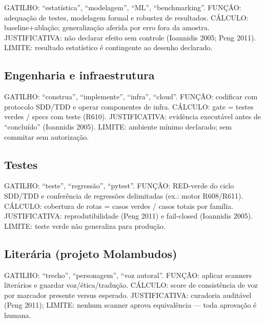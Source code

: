 \begin{descricao}
GATILHO: ``estatística'', ``modelagem'', ``ML'', ``benchmarking''.
FUNÇÃO: adequação de testes, modelagem formal e robustez de resultados.
CÁLCULO: baseline+ablação; generalização aferida por erro fora da amostra.
JUSTIFICATIVA: não declarar efeito sem controle (Ioannidis 2005; Peng 2011).
LIMITE: resultado estatístico é contingente ao desenho declarado.
\end{descricao}

\subsection{Engenharia e infraestrutura}

\begin{descricao}
GATILHO: ``construa'', ``implemente'', ``infra'', ``cloud''. FUNÇÃO:
codificar com protocolo SDD/TDD e operar componentes de infra.
CÁLCULO: gate = testes verdes / specs com teste (R610). JUSTIFICATIVA:
evidência executável antes de ``concluído'' (Ioannidis 2005). LIMITE:
ambiente mínimo declarado; sem commitar sem autorização.
\end{descricao}

\subsection{Testes}

\begin{descricao}
GATILHO: ``teste'', ``regressão'', ``pytest''. FUNÇÃO: RED-verde do ciclo
SDD/TDD e conferência de regressões delimitadas (ex.: motor R608/R611).
CÁLCULO: cobertura de rotas = casos verdes / casos totais por família.
JUSTIFICATIVA: reprodutibilidade (Peng 2011) e fail-closed (Ioannidis 2005).
LIMITE: teste verde não generaliza para produção.
\end{descricao}

\subsection{Literária (projeto Molambudos)}

\begin{descricao}
GATILHO: ``trecho'', ``personagem'', ``voz autoral''. FUNÇÃO: aplicar
scanners literários e guardar voz/ética/tradução. CÁLCULO: score de
consistência de voz por marcador presente versus esperado. JUSTIFICATIVA:
curadoria auditável (Peng 2011); LIMITE: nenhum scanner aprova equivalência —
toda aprovação é humana.
\end{descricao}

